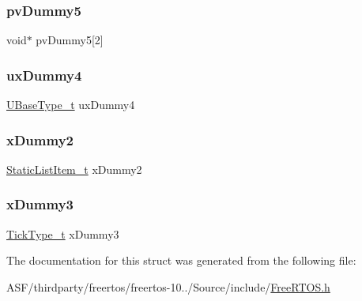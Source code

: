 \mbox{\label{structx_s_t_a_t_i_c___t_i_m_e_r_abae37cf280ed6295ec4169577ad19250}} 
\subsubsection{\texorpdfstring{pvDummy5}{pvDummy5}}
{\footnotesize\ttfamily void$\ast$ pv\+Dummy5\mbox{[}2\mbox{]}}

\mbox{\label{structx_s_t_a_t_i_c___t_i_m_e_r_a26be05b0990c51a2754226b559ab6550}} 
\subsubsection{\texorpdfstring{uxDummy4}{uxDummy4}}
{\footnotesize\ttfamily \mbox{\hyperlink{portmacro_8h_a646f89d4298e4f5afd522202b11cb2e6}{U\+Base\+Type\+\_\+t}} ux\+Dummy4}

\mbox{\label{structx_s_t_a_t_i_c___t_i_m_e_r_af110422a11e634c23400ce5d10bd8b7f}} 
\subsubsection{\texorpdfstring{xDummy2}{xDummy2}}
{\footnotesize\ttfamily \mbox{\hyperlink{_free_r_t_o_s_8h_a1d31bc0472385a87424518da484d9e09}{Static\+List\+Item\+\_\+t}} x\+Dummy2}

\mbox{\label{structx_s_t_a_t_i_c___t_i_m_e_r_ac1b972afc468f0e753a25442242e6137}} 
\subsubsection{\texorpdfstring{xDummy3}{xDummy3}}
{\footnotesize\ttfamily \mbox{\hyperlink{portmacro_8h_aa69c48c6e902ce54f70886e6573c92a9}{Tick\+Type\+\_\+t}} x\+Dummy3}



The documentation for this struct was generated from the following file\+:\begin{DoxyCompactItemize}
\item 
A\+S\+F/thirdparty/freertos/freertos-\/10../\+Source/include/\mbox{\hyperlink{_free_r_t_o_s_8h}{Free\+R\+T\+O\+S.\+h}}\end{DoxyCompactItemize}
